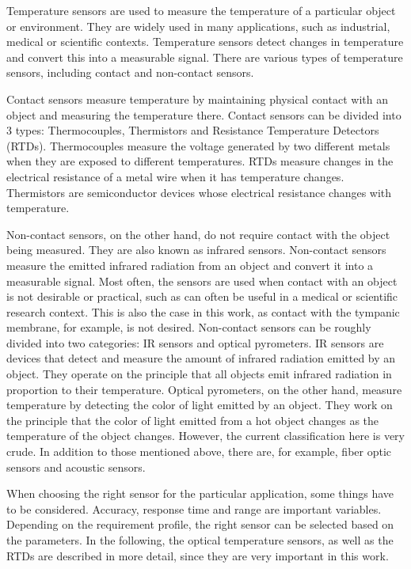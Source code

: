 Temperature sensors are used to measure the temperature of a particular object or environment.
They are widely used in many applications, such as industrial, medical or scientific contexts.
Temperature sensors detect changes in temperature and convert this into a measurable signal.
There are various types of temperature sensors, including contact and non-contact sensors.

Contact sensors measure temperature by maintaining physical contact with an object and measuring the temperature there.
Contact sensors can be divided into 3 types: Thermocouples, Thermistors and Resistance Temperature Detectors (RTDs). 
Thermocouples measure the voltage generated by two different metals when they are exposed to different temperatures.
RTDs measure changes in the electrical resistance of a metal wire when it has temperature changes.
Thermistors are semiconductor devices whose electrical resistance changes with temperature.

Non-contact sensors, on the other hand, do not require contact with the object being measured. They are also known as infrared sensors.
Non-contact sensors measure the emitted infrared radiation from an object and convert it into a measurable signal.
Most often, the sensors are used when contact with an object is not desirable or practical, such as can often be useful in a medical or scientific research context. 
This is also the case in this work, as contact with the tympanic membrane, for example, is not desired.
Non-contact sensors can be roughly divided into two categories: IR sensors and optical pyrometers.
IR sensors are devices that detect and measure the amount of infrared radiation emitted by an object. They operate on the principle that all objects emit infrared radiation in proportion to their temperature. 
Optical pyrometers, on the other hand, measure temperature by detecting the color of light emitted by an object. They work on the principle that the color of light emitted from a hot object changes as the temperature of the object changes.
However, the current classification here is very crude.
In addition to those mentioned above, there are, for example, fiber optic sensors and acoustic sensors.

When choosing the right sensor for the particular application, some things have to be considered.
Accuracy, response time and range are important variables.
Depending on the requirement profile, the right sensor can be selected based on the parameters.
In the following, the optical temperature sensors, as well as the RTDs are described in more detail, since they are very important in this work.

